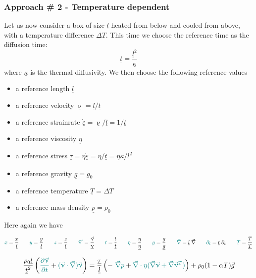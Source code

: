 \subsubsection{Approach \# 2 - Temperature dependent}

Let us now consider a box of size $\underline{l}$ heated from below and cooled from above, with a
temperature difference $\Delta T$. This time we choose the reference time as the diffusion time:
\[
\underline{t}=\frac{\underline{l}^2}{\underline{\kappa}}
\]
where $\underline{\kappa}$ is the thermal diffusivity.
We then choose the following reference values

\begin{itemize}
\item a reference length $\underline{l}$
\item a reference velocity $\underline{\upnu} = \underline{l}/\underline{t}$ 
\item a reference strainrate $\underline{\dot{\varepsilon}}
=\underline{\upnu}/\underline{l}= 1/\underline{t}$
\item a reference viscosity $\underline{\eta}$
\item a reference stress 
$\underline{\tau}=\underline{\eta}\underline{\dot{\varepsilon}} = \underline{\eta}/\underline{t} 
= \underline{\eta} \kappa / l^2 $
\item a reference gravity $\underline{g} = g_0$ 
\item a reference temperature $\underline{T}=\Delta T$
\item a reference mass density $\underline{\rho}=\rho_0$
\end{itemize}
Here again we have 

\[
{\color{teal}x} = \frac{x}{\underline{l}}
\qquad
{\color{teal}y} = \frac{y}{\underline{l}}
\qquad
{\color{teal}z} = \frac{z}{\underline{l}}
\qquad
{\color{teal}\vec\upnu'} = \frac{\vec\upnu}{\underline{\upnu}}
\qquad
{\color{teal}t} = \frac{t}{\underline{t}}
\qquad
{\color{teal} \eta} = \frac{\eta}{\underline{\eta}}
\qquad
{\color{teal} g} =\frac{g}{\underline{g}}
\qquad
{\color{teal} \vec\nabla} = \underline{l}\; \vec\nabla
\qquad
{\color{teal} \partial_t} = \underline{t}\; \partial_t 
\qquad
{\color{teal} T} = \frac{T}{\underline{T}}
\]


\[
\frac{\rho_0 \underline{l}}{\underline{t}^2} 
\left( {\color{teal} \frac{\partial \vec\upnu}{\partial t}}
+{\color{teal} (\vec\upnu \cdot\vec\nabla) \vec\upnu} 
\right)
=
\frac{\underline{\tau}}{\underline{l}}
\left( - \ {\color{teal} \vec\nabla p}
+ {\color{teal} \vec\nabla \cdot \eta (\vec\nabla \vec \upnu + \vec\nabla \vec \upnu ^T)}
\right)
+ \rho_0(1 - \alpha T) \vec{g}
\]


